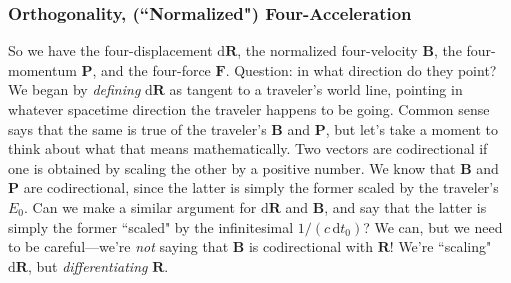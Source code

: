 \documentclass[12pt]{article}
\renewcommand{\vv}[1]{\mathbf{#1}}
\newcommand{\dd}[1]{\mathrm{d}#1}
\begin{document}
\subsubsection[Orthogonality, (“Normalized”) Four-Acceleration]{Orthogonality, (``Normalized") Four-Acceleration}

So we have the four-displacement $\dd \vv R$, the normalized four-velocity $\vv B$, the four-momentum $\vv P$, and the four-force $\vv F$. Question: in what direction do they point? We began by \emph{defining} $\dd \vv R$ as tangent to a traveler's world line, pointing in whatever spacetime direction the traveler happens to be going. Common sense says that the same is true of the traveler's $\vv B$ and $\vv P$, but let's take a moment to think about what that means mathematically. Two vectors are codirectional if one is obtained by scaling the other by a positive number. We know that $\vv B$ and $\vv P$ are codirectional, since the latter is simply the former scaled by the traveler's $E_0$. Can we make a similar argument for $\dd \vv R$ and $\vv B$, and say that the latter is simply the former ``scaled" by the infinitesimal $1/(c \, \dd t_0)$? We can, but we need to be careful---we're \emph{not} saying that $\vv B$ is codirectional with $\vv R$! We're ``scaling" $\dd \vv R$, but \emph{differentiating} $\vv R$.
\end{document}
